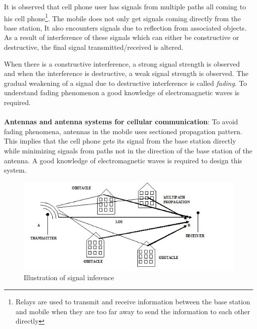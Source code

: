 It is observed that cell phone user has signals from multiple paths all coming to his cell phone\footnote{Relays are used to transmit and receive information between the base station and mobile when they are too far away to send the information to each other directly}. The mobile does not only get signals coming directly from the base station, It also encounters signals due to reflection from associated objects. As a result of interference of these signals which can either be constructive or destructive, the final signal transmitted/received is altered. 

When there is a constructive interference, a strong signal strength is observed and when the interference is destructive, a weak signal strength is observed.
The gradual weakening of a signal due to destructive interference is called \textit{fading}. To understand fading phenomenon a good knowledge of electromagnetic waves is required.\\\\

\textbf{Antennas and antenna systems for cellular communication}: To avoid fading phenomena, antennas in the mobile uses sectioned propagation pattern. This implies that the cell phone gets its signal from the base station directly while minimizing signals from paths not in the direction of the base station of the antenna. A good knowledge of electromagnetic waves is required to design this system.
\begin{figure}[h]
\centering
\includegraphics[scale=0.4]{./graphics/rod}
\caption{Illustration of signal inference}
\end{figure}
